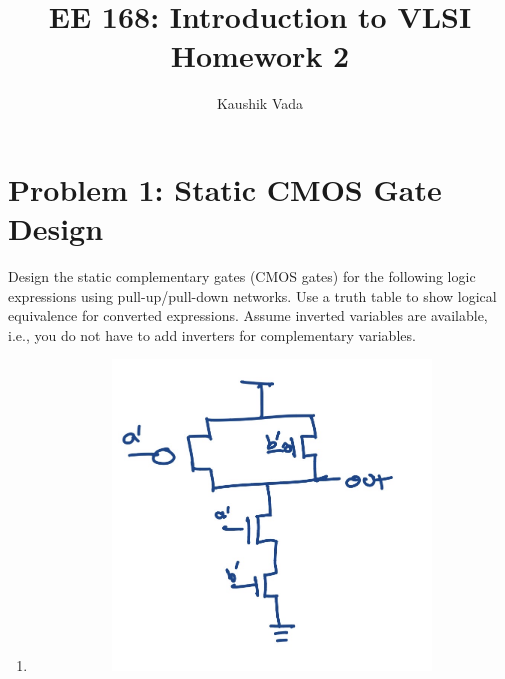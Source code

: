 \documentclass[11pt]{article}
\title{EE 168: Introduction to VLSI\\Homework 2}
\author{Kaushik Vada}
\begin{document}
\maketitle

\section*{Problem 1: Static CMOS Gate Design}
Design the static complementary gates (CMOS gates) for the following logic expressions using pull-up/pull-down networks. Use a truth table to show logical equivalence for converted expressions. Assume inverted variables are available, i.e., you do not have to add inverters for complementary variables.

\begin{enumerate}[label={\bfseries\alph*)}, itemsep=1em]
    \item
    \begin{figure}[H]
        \centering
        \begin{subfigure}{0.47\textwidth}
            \centering
            \includegraphics[width=\linewidth]{question1/1a.jpeg}
        \end{subfigure}
        \hfill
        \begin{subfigure}{0.47\textwidth}
            \centering
            {\renewcommand{\arraystretch}{1.25}%
            \setlength{\tabcolsep}{6pt}%
}
\end{subfigure}
\end{figure}
\end{enumerate}
\end{document}
